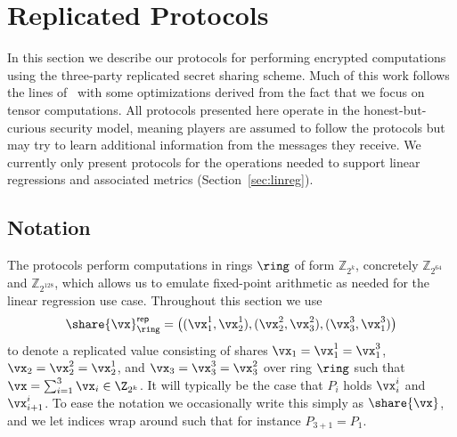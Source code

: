 \section{Replicated Protocols}

In this section we describe our protocols for performing encrypted computations using the three-party replicated secret sharing scheme. Much of this work follows the lines of~\cite{CCS:AFLNO16} with some optimizations derived from the fact that we focus on tensor computations. All protocols presented here operate in the honest-but-curious security model, meaning players are assumed to follow the protocols but may try to learn additional information from the messages they receive. We currently only present protocols for the operations needed to support linear regressions and associated metrics (Section~\ref{sec:linreg}).





\subsection{Notation}

The protocols perform computations in rings $\ring$ of form $\mathbb{Z}_{2^{k}}$, concretely $\mathbb{Z}_{2^{64}}$ and $\mathbb{Z}_{2^{128}}$, which allows us to emulate fixed-point arithmetic as needed for the linear regression use case. Throughout this section we use
$$
\share{\vx}^{\mathsf{rep}}_\ring = \left( (\vx_1^1, \vx_2^1), (\vx_2^2, \vx_3^2), (\vx_3^3, \vx_1^3) \right)
$$
to denote a replicated value consisting of shares $\vx_1 = \vx_1^1 = \vx_1^3$, $\vx_2 = \vx_2^2 = \vx_2^1$, and $\vx_3 = \vx_3^3 = \vx_3^2$ over ring $\ring$ such that $\vx = \sum_{i=1}^3 \vx_i \in \Z_{2^k}$. It will typically be the case that $P_i$ holds $\vx_i^i$ and $\vx_{i+1}^i$. To ease the notation we occasionally write this simply as $\share{\vx}$, and we let indices wrap around such that for instance $P_{3+1} = P_1$.










